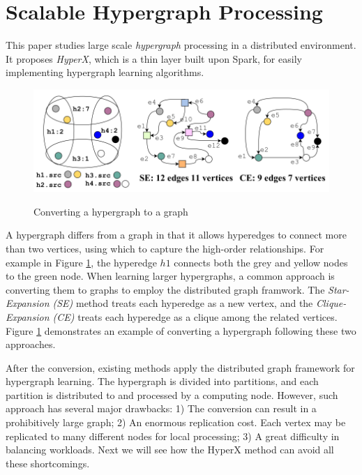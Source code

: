 \documentclass[paper=a4, fontsize=18pt]{article} %
\numberwithin{equation}{section} %
\numberwithin{figure}{section} %
\numberwithin{table}{section} %
\begin{document}
\section{Scalable Hypergraph Processing \cite{HZY15}}

This paper studies large scale \emph{hypergraph} processing in a distributed environment. It proposes \emph{HyperX}, which is a thin layer built upon Spark, for easily implementing hypergraph learning algorithms.

\begin{figure}[h]
  \centering
  \includegraphics[width=.6\linewidth]{8_15_HyperX1.png}\\
  \caption{Converting a hypergraph to a graph}\label{fig:HyperX1}
\end{figure}

A hypergraph differs from a graph in that it allows hyperedges to connect more than two vertices, using which to capture the high-order relationships. For example in Figure \ref{fig:HyperX1}, the hyperedge $h1$ connects both the grey and yellow nodes to the green node. When learning larger hypergraphs, a common approach is converting them to graphs to employ the distributed graph framwork. The \emph{Star-Expansion (SE)} method treats each hyperedge as a new vertex, and the \emph{Clique-Expansion (CE)} treats each hyperedge as a clique among the related vertices. Figure \ref{fig:HyperX1} demonstrates an example of converting a hypergraph following these two approaches.

After the conversion, existing methods apply the distributed graph framework for hypergraph learning. The hypergraph is divided into partitions, and each partition is distributed to and processed by a computing node. However, such approach has several major drawbacks: 1) The conversion can result in a prohibitively large graph; 2) An enormous replication cost. Each vertex may be replicated to many different nodes for local processing; 3) A great difficulty in balancing workloads. Next we will see how the HyperX method can avoid all these shortcomings.
\end{document}

